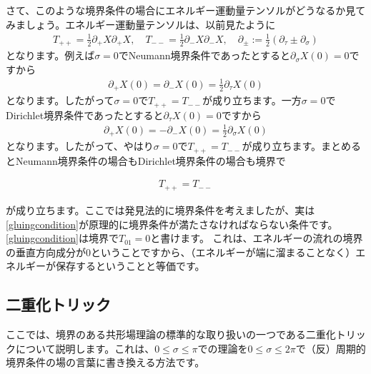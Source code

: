 \documentclass[report,paper=a4, fontsize=12pt, line_length=16cm, number_of_lines=34,dvipdfmx]{jlreq}
\newenvironment{important}{\begin{tcolorbox}[
  colback = white,
  colframe = red!35,
  boxrule = 2mm,
  fonttitle = \bfseries,
  after = \noindent] }{\end{tcolorbox}}
\numberwithin{equation}{chapter}
\numberwithin{equation}{section}
\newcommand{\del}{\partial}
\begin{document}
さて、このような境界条件の場合にエネルギー運動量テンソルがどうなるか見てみましょう。エネルギー運動量テンソルは、以前見たように
\begin{align}
  T_{++}=\frac12 \del_{+}X\del_{+}X,\quad
  T_{--}=\frac12 \del_{-}X\del_{-}X,\quad
  \del_{\pm}:=\frac12 (\del_{\tau}\pm \del_{\sigma})
\end{align}
となります。例えば$\sigma=0$でNeumann境界条件であったとすると$\del_{\sigma}X(0)=0$ですから
\begin{align}
  \del_{+}X(0)=\del_{-}X(0)=\frac12 \del_{\tau}X(0)
\end{align}
となります。したがって$\sigma=0$で$T_{++}=T_{--}$が成り立ちます。一方$\sigma=0$でDirichlet境界条件であったとすると$\del_{\tau}X(0)=0$ですから
\begin{align}
  \del_{+}X(0)=-\del_{-}X(0)=\frac12 \del_{\sigma}X(0)
\end{align}
となります。したがって、やはり$\sigma=0$で$T_{++}=T_{--}$が成り立ちます。まとめるとNeumann境界条件の場合もDirichlet境界条件の場合も境界で
\begin{important}
  \begin{align}
    T_{++}=T_{--}\label{gluingcondition}
  \end{align}
\end{important}
が成り立ちます。ここでは発見法的に境界条件を考えましたが、実は\eqref{gluingcondition}が原理的に境界条件が満たさなければならない条件です。
\eqref{gluingcondition}は境界で$T_{01}=0$と書けます。
これは、エネルギーの流れの境界の垂直方向成分が$0$ということですから、（エネルギーが端に溜まることなく）エネルギーが保存するということと等価です。

\subsection{二重化トリック}
ここでは、境界のある共形場理論の標準的な取り扱いの一つである二重化トリックについて説明します。これは、$0\le \sigma \le \pi$での理論を$0\le \sigma \le 2\pi$で（反）周期的境界条件の場の言葉に書き換える方法です。
\end{document}
